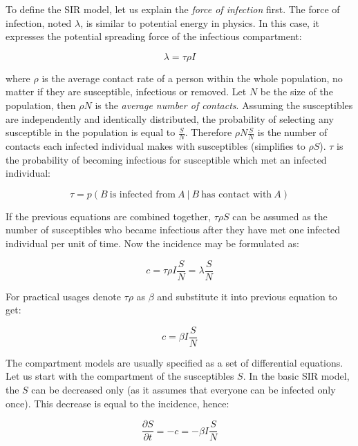 \documentclass[
  digital, %
  oneside, %
  lof,     %
  lot,     %
]{fithesis4}
\begin{document}
To define the SIR model, let us explain the \textit{force of infection} first.
The force of infection, noted $\lambda$, is similar to potential energy in physics. In this case, it expresses 
the potential spreading force of the infectious compartment:

\begin{equation}
	\lambda = \tau \rho I
\end{equation}

where $\rho$ is the average contact rate of a person within the whole population, no matter if they are susceptible, infectious or removed.
Let $N$ be the size of the population, then $\rho N$ is the \textit{average number of contacts}.
Assuming the susceptibles are independently and identically distributed, the probability of selecting any susceptible in the population is equal to $\frac{S}{N}$.
Therefore $\rho N\frac{S}{N}$ is the number of contacts each infected individual makes with susceptibles (simplifies to $\rho S$).
$\tau$ is the probability of becoming infectious for susceptible which met an infected individual:

\begin{equation}
	\tau = p \left( B~\textrm{is infected from}~A~|~B~\textrm{has contact with}~A \right)
\end{equation}

If the previous equations are combined together, $\tau \rho S$ can be assumed as the number of susceptibles who became infectious after they have met one infected individual per unit of time.
Now the incidence may be formulated as:

\begin{equation}
	c = \tau \rho I \frac{S}{N} = \lambda \frac{S}{N}
\end{equation}

For practical usages denote $\tau \rho$ as $\beta$ and substitute it into previous equation to get:

\begin{equation}
	c = \beta I \frac{S}{N}
\end{equation}

The compartment models are usually specified as a set of differential equations.
Let us start with the compartment of the susceptibles $S$. In the basic SIR model, the $S$ can be decreased only (as it assumes that everyone can be infected only once).
This decrease is equal to the incidence, hence:

\begin{equation}\label{eq:sir-model-incidence}
	\frac{\partial{S}}{\partial{t}} = -c = -\beta I \frac{S}{N}
\end{equation}
\end{document}
